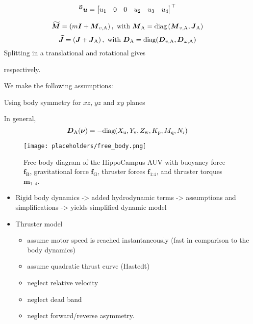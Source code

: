 \begin{equation}
	\label{eq:input-vector}
	\prescript{\mathcal{B}}{}{\mbox{$\bm{u}$}} =
	\begin{bmatrix}
		u_1 &
		0 &
		0 &
		u_2 &
		u_3 &
		u_4 
	\end{bmatrix}^\top
\end{equation}

\begin{equation}
	\mbox{$\widetilde{\bm{M}}$} = \left(m\mbox{$\bm{I}$} + \mbox{$\bm{M}$}_{v, \text{A}}\right), \text{ with }
	\mbox{$\bm{M}$}_\text{A} = \text{diag}\left(\mbox{$\bm{M}$}_{v, \text{A}}, \mbox{$\bm{J}$}_\text{A}\right)
\end{equation}
\begin{equation}
	\mbox{$\widetilde{\bm{J}}$} = \left(\mbox{$\bm{J}$} + \mbox{$\bm{J}$}_\text{A}\right), \text{ with }
	\mbox{$\bm{D}$}_\text{A} = \text{diag}(\mbox{$\bm{D}$}_{v,\text{A}}, \mbox{$\bm{D}$}_{\omega,\text{A}})
\end{equation}
Splitting  in a translational and rotational gives

respectively.

We make the following assumptions:

Using body symmetry for $xz$, $yz$ and $xy$ planes 


In general, 
\begin{equation}
	\mbox{$\bm{D}$}_\text{A}(\mbox{$\bm{\nu}$}) = -\text{diag}(X_\text{u}, Y_\text{v}, Z_\text{w}, K_\text{p}, M_\text{q}, N_\text{r})
\end{equation}


\begin{figure}[h!]
	\centering
	\texttt{[image: placeholders/free\_body.png]}
	\caption{Free body diagram of the HippoCampus \mu AUV with buoyancy force $\bm{f}_\textrm{B}$, gravitational force $\bm{f}_\textrm{G}$, thruster forces $\bm{f}_\textrm{1:4}$, and thruster torques $\bm{m}_{1:4}$.}
\end{figure}
\begin{itemize}
	\color{red}
	\item Rigid body dynamics -> added hydrodynamic terms -> assumptions and simplifications -> yields simplified dynamic model
	\item Thruster model
	\begin{itemize}
		\item assume motor speed is reached instantaneously (fast in comparison to the body dynamics)
		\item assume quadratic thrust curve (Hastedt)
		\item neglect relative velocity
		\item neglect dead band
		\item neglect forward/reverse asymmetry.
	\end{itemize}
\end{itemize}

